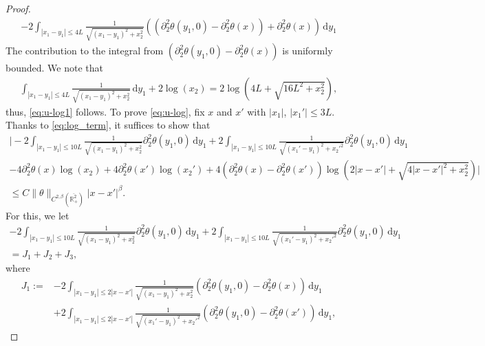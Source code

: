 \documentclass[10pt]{amsart}
\theoremstyle{definition}
\theoremstyle{remark}
\numberwithin{equation}{section}
\newcommand{\ud}{\mathrm{d}}
\newcommand{\rd}{\partial}
\newcommand{\0}{\emptyset}
\newcommand{\ohp}{\overline{\bbR^2_+}}
\newcommand{\tht}{\theta}
\newcommand{\bbR}{\mathbb R}
\begin{document}
\begin{proof}
\begin{equation*}
			\begin{split}
				-2 \int_{|x_1-y_1| \le 4L} \frac{1}{ \sqrt{ (x_1-y_1)^2 + x_2^2 }  } \left(  (\rd_{2}^2\tht(y_1,0) - \rd_{2}^2\tht(x)) + \rd_{2}^2\tht(x) \right) \, \ud y_1 
			\end{split}
		\end{equation*} The contribution to the integral from $(\rd_{2}^2\tht(y_1,0) - \rd_{2}^2\tht(x))$ is uniformly bounded. We note that \begin{equation}\label{eq:log_x2}
			\begin{split}
				\int_{|x_1-y_1| \le 4L } 	\frac{1}{ \sqrt{ (x_1-y_1)^2 + x_2^2 }  } \, \ud y_1 + 2\log(x_2) = 2\log (4L + \sqrt{16L^2+x_2^2}),
			\end{split}
		\end{equation} thus, \eqref{eq:u-log1} follows. To prove \eqref{eq:u-log}, fix $x$ and $x'$ with $|x_1|$, $|x_1'| \leq 3L$. Thanks to \eqref{eq:log_term}, it suffices to show that \begin{gather*}
			\bigg| -2 \int_{|x_1-y_1| \le 10L } \frac{1}{ \sqrt{ (x_1-y_1)^2 + x_2^2 }  } \rd_{2}^2 \tht(y_1,0) \, \ud y_1 +2 \int_{|x_1-y_1| \le 10L } \frac{1}{ \sqrt{ (x_1'-y_1)^2 + x_2'^2 }  } \rd_{2}^2 \tht(y_1,0) \, \ud y_1 \\
			- 4 \rd_{2}^2 \tht(x) \log (x_2) + 4 \rd_{2}^2 \tht(x') \log (x_2') + 4 (\rd_{2}^2 \tht(x) - \rd_{2}^2 \tht(x')) \log (2|x-x'| + \sqrt{4|x-x'|^2 + x_2^2}) \bigg| \\
			\leq C \| \tht \|_{C^{2,\beta}(\ohp)} |x-x'|^{\beta}.
		\end{gather*} For this, we let \begin{gather*}
			-2 \int_{|x_1-y_1| \le 10L } \frac{1}{ \sqrt{ (x_1-y_1)^2 + x_2^2 }  } \rd_{2}^2 \tht(y_1,0) \, \ud y_1 +2 \int_{|x_1-y_1| \le 10L } \frac{1}{ \sqrt{ (x_1'-y_1)^2 + x_2'^2 }  } \rd_{2}^2 \tht(y_1,0) \, \ud y_1 \\
			=J_1+J_2+J_3,
		\end{gather*} where \begin{equation*}
			\begin{split}
				J_1 := &-2 \int_{|x_1-y_1| \le 2|x-x'| } \frac{1}{ \sqrt{ (x_1-y_1)^2 + x_2^2 }  } (\rd_{2}^2 \tht(y_1,0) - \rd_{2}^2 \tht(x)) \, \ud y_1 \\
				&+2 \int_{|x_1-y_1| \le 2|x-x'| } \frac{1}{ \sqrt{ (x_1'-y_1)^2 + x_2'^2 }  } (\rd_{2}^2 \tht(y_1,0) - \rd_{2}^2 \tht(x')) \, \ud y_1,
			\end{split}
		\end{equation*} \begin{equation*}

\end{equation*}
\end{proof}
\end{document}
